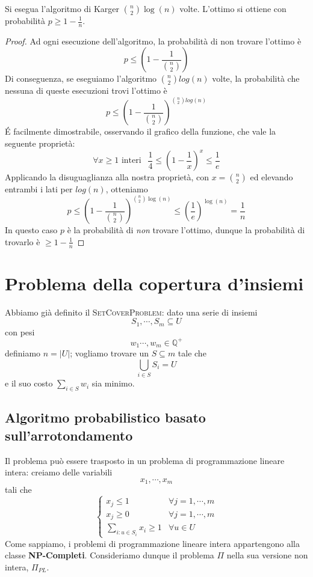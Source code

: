 \begin{oss}
	Si esegua l'algoritmo di Karger ${n\choose{2}} \log(n)$ volte.
	L'ottimo si ottiene con probabilità $p \geq 1 - \frac{1}{n}$.
\end{oss}
\begin{proof}
	Ad ogni esecuzione dell'algoritmo, la probabilità di non trovare l'ottimo è
	$$
		p \leq \left(1 - \frac{1}{{n \choose{2}}}\right)
	$$
	Di conseguenza, se eseguiamo l'algoritmo ${n \choose{2}} log(n)$ volte,
	la probabilità che nessuna di queste esecuzioni trovi l'ottimo è
	$$
		p \leq \left(1 - \frac{1}{{n \choose 2}}\right)^{{n \choose{2}}log(n)}
	$$
	\'E facilmente dimostrabile, osservando il grafico della funzione, che vale
	la seguente proprietà:
	$$
		\forall x \geq 1 \text{ interi } ~~ \frac{1}{4} \leq ( 1 - \frac{1}{x})^x \leq \frac{1}{e}
	$$
	Applicando la disuguaglianza alla nostra proprietà, con $x={n \choose{2}}$
	ed elevando entrambi i lati per $log(n)$, otteniamo
	$$
		p \leq \left( 1 - \frac{1}{{n \choose 2}}\right) ^{{n \choose 2} \log (n)} \leq \left(\frac{1}{e}\right)^{\log(n)} = \frac{1}{n}
	$$
	In questo caso $p$ è la probabilità di \textit{non} trovare l'ottimo,
	dunque la probabilità di trovarlo è $\geq 1 - \frac{1}{n}$
\end{proof}

\section{Problema della copertura d'insiemi}
Abbiamo già definito il \textsc{SetCoverProblem}:
dato una serie di insiemi
$$
	S_1, \cdots, S_m \subseteq U
$$
con pesi
$$
	w_1 \cdots, w_m \in \mathbb{Q}^+
$$
definiamo $n = |U|$; vogliamo trovare un $S \subseteq m$ tale che
$$
	\bigcup_{i \in S} S_i = U
$$
e il suo costo $ \sum_{i \in S} w_i$ sia minimo.

\subsection{Algoritmo probabilistico basato sull'arrotondamento}
Il problema può essere trasposto in un problema di programmazione lineare intera:
creiamo delle variabili
$$
	x_1, \cdots, x_m
$$
tali che
$$
	\begin{cases}
		x_j \leq 1                     & \forall j = 1, \cdots, m \\
		x_j \geq 0                     & \forall j = 1, \cdots, m \\
		\sum_{i: u \in S_i} x_i \geq 1 & \forall u \in U
	\end{cases}
$$
Come sappiamo, i problemi di programmazione lineare intera appartengono alla
classe \textbf{NP-Completi}. Consideriamo dunque il problema $\Pi$ nella
sua versione non intera, $\Pi_{PL}$.

